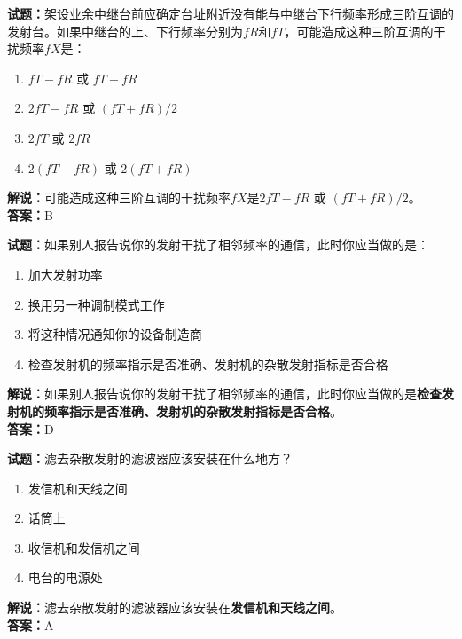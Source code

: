 \documentclass{ctexbook}
\begin{document}
\bigskip


\noindent\textbf{试题：}架设业余中继台前应确定台址附近没有能与中继台下行频率形成三阶互调的发射台。如果中继台的上、下行频率分别为\(fR\)和\(fT\)，可能造成这种三阶互调的干扰频率\(fX\)是：
\begin{enumerate}[leftmargin=3em]
\item \(fT - fR\) 或 \(fT + fR\)
\item \(2fT - fR\) 或 \((fT + fR ) / 2\)
\item \(2fT\) 或 \(2fR\)
\item \(2(fT - fR)\) 或 \(2(fT + fR )\) %
\end{enumerate}
\noindent\textbf{解说：}可能造成这种三阶互调的干扰频率\(fX\)是\(2fT - fR\) 或 \((fT + fR ) / 2\)。\\\noindent\textbf{答案：}B



\bigskip


\noindent\textbf{试题：}如果别人报告说你的发射干扰了相邻频率的通信，此时你应当做的是：
\begin{enumerate}[leftmargin=3em]
\item 加大发射功率
\item 换用另一种调制模式工作
\item 将这种情况通知你的设备制造商
\item 检查发射机的频率指示是否准确、发射机的杂散发射指标是否合格
\end{enumerate}
\noindent\textbf{解说：}如果别人报告说你的发射干扰了相邻频率的通信，此时你应当做的是\textbf{检查发射机的频率指示是否准确、发射机的杂散发射指标是否合格}。\\\noindent\textbf{答案：}D



\bigskip


\noindent\textbf{试题：}滤去杂散发射的滤波器应该安装在什么地方？
\begin{enumerate}[leftmargin=3em]
\item 发信机和天线之间
\item 话筒上
\item 收信机和发信机之间
\item 电台的电源处
\end{enumerate}
\noindent\textbf{解说：}滤去杂散发射的滤波器应该安装在\textbf{发信机和天线之间}。\\\noindent\textbf{答案：}A


\bigskip
\end{document}
